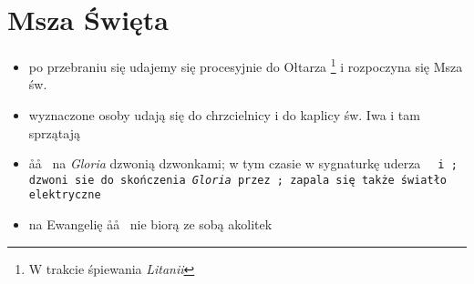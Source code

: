 \section{Msza Święta}

\begin{itemize}
	\item po przebraniu się udajemy się procesyjnie do Ołtarza \footnote{W
		      trakcie śpiewania \textit{Litanii}} i rozpoczyna się Msza św.
	\item wyznaczone osoby udają się do chrzcielnicy i do kaplicy św. Iwa i tam
	      sprzątają
	\item \aa\aa~ na \textit{Gloria} dzwonią dzwonkami; w tym czasie w
	      sygnaturkę uderza \tt~ i \zz; dzwoni sie do skończenia
	      \textit{Gloria} przez \ii; zapala się także światło elektryczne
	\item na Ewangelię \aa\aa~ nie biorą ze sobą akolitek
\end{itemize}